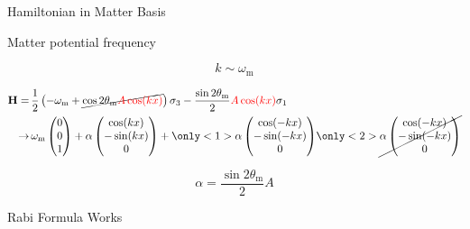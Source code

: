 \documentclass[9pt]{beamer}
\begin{document}
\begin{darkframes}
\begin{frame}{Hamiltonian in Matter Basis}



Matter potential frequency

\begin{equation*}
    k\sim \omega_{\mathrm m}
\end{equation*}


\begin{align*}
    \mathbf {H} =\,& \frac{1}{2}\left( - \omega_{\mathrm{m}}
    +\cancel{
     \cos 2\theta_{\mathrm{m}}{\color{red}A\cos(kx)} } \right) \sigma_3 - \frac{  \sin 2\theta_{\mathrm{m}
    }
    }{2}{\color{red}A \cos(kx)}  \sigma_1 \\
    \to\, &  \omega_{\mathrm m}\begin{pmatrix}
    0\\
    0\\
    1
    \end{pmatrix} + \alpha \begin{pmatrix}
    \cos (kx)\\
    -\sin(k x)\\
    0
    \end{pmatrix}  + \only<1>{\alpha \begin{pmatrix}
    \cos (-kx)\\
    -\sin( - k x)\\
    0
    \end{pmatrix}
    }
    \only<2>{\cancel{\alpha \begin{pmatrix}
    \cos (-kx)\\
    -\sin( - k x)\\
    0
    \end{pmatrix}
    }
    }
\end{align*}

\begin{equation*}
\alpha = \frac{\sin2\theta_{\mathrm m}}{2}A
\end{equation*}







\end{frame}



\begin{frame}{Rabi Formula Works}



\end{frame}
\end{darkframes}
\end{document}

